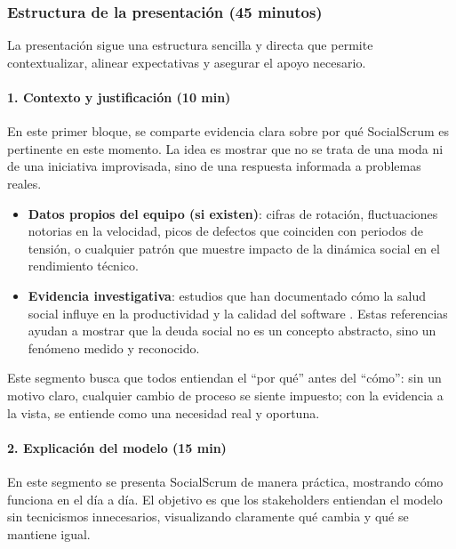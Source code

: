 \subsubsection{Estructura de la presentación (45 minutos)}

La presentación sigue una estructura sencilla y directa que permite contextualizar, alinear expectativas y asegurar el apoyo necesario.

\paragraph{1. Contexto y justificación (10 min)}

En este primer bloque, se comparte evidencia clara sobre por qué SocialScrum es pertinente en este momento. La idea es mostrar que no se trata de una moda ni de una iniciativa improvisada, sino de una respuesta informada a problemas reales.

\begin{itemize}
    \item \textbf{Datos propios del equipo (si existen)}: cifras de rotación, fluctuaciones notorias en la velocidad, picos de defectos que coinciden con periodos de tensión, o cualquier patrón que muestre impacto de la dinámica social en el rendimiento técnico.

    \item \textbf{Evidencia investigativa}: estudios que han documentado cómo la salud social influye en la productividad y la calidad del software \cite{tamburri2013socialdebt, saeeda2024nontechnicaldebt}. Estas referencias ayudan a mostrar que la deuda social no es un concepto abstracto, sino un fenómeno medido y reconocido.
\end{itemize}

Este segmento busca que todos entiendan el ``por qué'' antes del ``cómo'': sin un motivo claro, cualquier cambio de proceso se siente impuesto; con la evidencia a la vista, se entiende como una necesidad real y oportuna.

\paragraph{2. Explicación del modelo (15 min)}

En este segmento se presenta SocialScrum de manera práctica, mostrando cómo funciona en el día a día. El objetivo es que los stakeholders entiendan el modelo sin tecnicismos innecesarios, visualizando claramente qué cambia y qué se mantiene igual.

